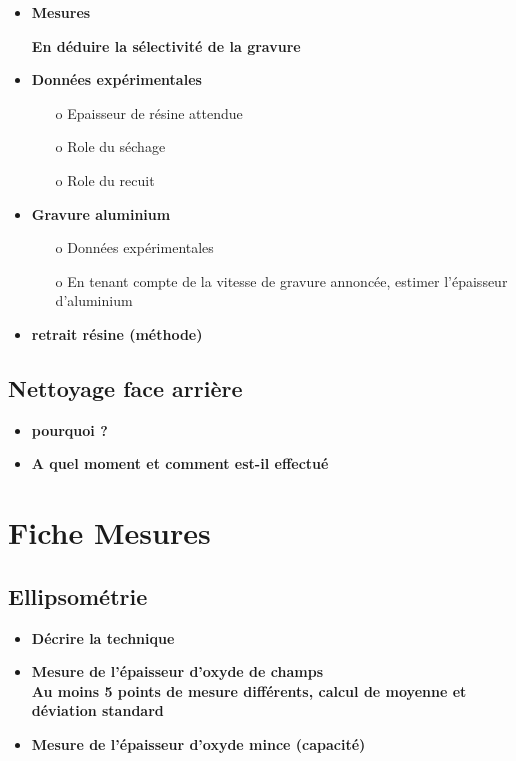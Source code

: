 \documentclass[11pt]{article}
\begin{document}
\begin{itemize}

\item \textbf{Mesures}

\textbf{En d\'eduire la s\'electivit\'e de la gravure} 

\item \textbf{Donn\'ees exp\'erimentales}

\begin{itemize}
\item[o] Epaisseur de r\'esine attendue
\item[o] Role du s\'echage
\item[o] Role du recuit

\end{itemize}

\item \textbf{Gravure aluminium}

\begin{itemize}
\item[o] Donn\'ees exp\'erimentales
\item[o] En tenant compte de la vitesse de gravure annonc\'ee, estimer l'\'epaisseur d'aluminium
\end{itemize}

\item \textbf{retrait r\'esine (m\'ethode)}

\end{itemize}

\subsection{Nettoyage face arri\`ere}

\begin{itemize}
\item \textbf{pourquoi ? }
\item \textbf{A quel moment et comment est-il effectu\'e}
\end{itemize}


\clearpage

\section{Fiche Mesures}

\subsection{Ellipsom\'etrie}

\begin{itemize}
\item \textbf{ D\'ecrire la technique  }
\item \textbf{ Mesure de l'\'epaisseur d'oxyde de champs \\ 
Au moins 5 points de mesure diff\'erents, calcul de moyenne et d\'eviation standard}
\item \textbf{ Mesure de l'\'epaisseur d'oxyde mince (capacit\'e)}
\end{itemize}
\end{document}
